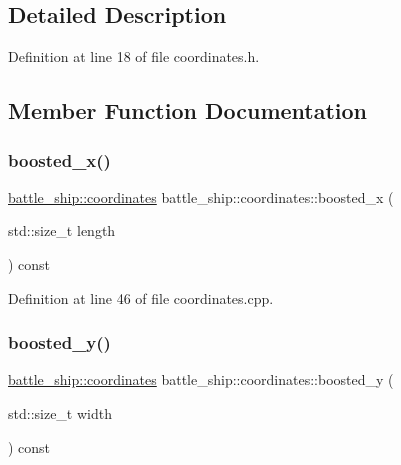 \subsection{Detailed Description}


Definition at line 18 of file coordinates.\+h.



\subsection{Member Function Documentation}
\mbox{\label{structbattle__ship_1_1coordinates_a2ab2b70ad53571e339c4c509547419c7}} 
\subsubsection{\texorpdfstring{boosted\+\_\+x()}{boosted\_x()}}
{\footnotesize\ttfamily \hyperlink{structbattle__ship_1_1coordinates}{battle\+\_\+ship\+::coordinates} battle\+\_\+ship\+::coordinates\+::boosted\+\_\+x (\begin{DoxyParamCaption}\item[{std\+::size\+\_\+t}]{length }\end{DoxyParamCaption}) const}



Definition at line 46 of file coordinates.\+cpp.

\mbox{\label{structbattle__ship_1_1coordinates_af45f6a271dd7c5c97556d2593d455313}} 
\subsubsection{\texorpdfstring{boosted\+\_\+y()}{boosted\_y()}}
{\footnotesize\ttfamily \hyperlink{structbattle__ship_1_1coordinates}{battle\+\_\+ship\+::coordinates} battle\+\_\+ship\+::coordinates\+::boosted\+\_\+y (\begin{DoxyParamCaption}\item[{std\+::size\+\_\+t}]{width }\end{DoxyParamCaption}) const}



